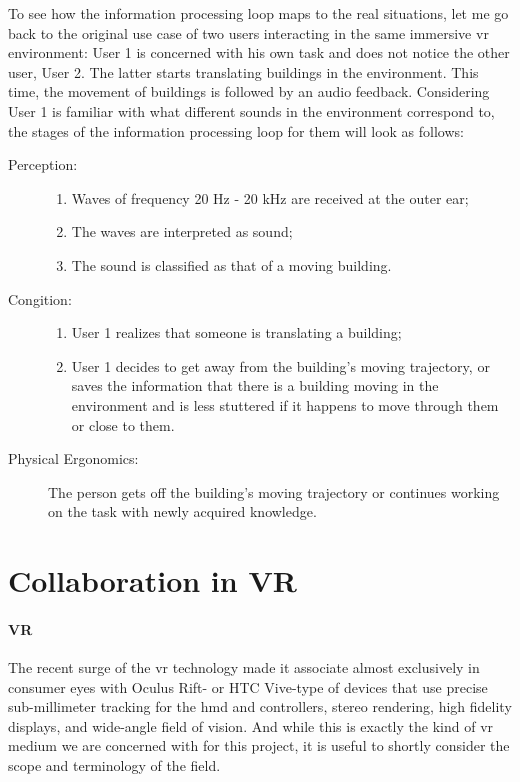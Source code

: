 To see how the information processing loop maps to the real situations, let me go back to the original use case of two users interacting in the same immersive \gls{vr} environment: User 1 is concerned with his own task and does not notice the other user, User 2. The latter starts translating buildings in the environment. This time, the movement of buildings is followed by an audio feedback.
Considering User 1 is familiar with what different sounds in the environment correspond to, the stages of the information processing loop for them will look as follows:
\begin{description}
	\item[Perception:] \hfill
		\begin{enumerate}
			\item Waves of frequency 20 Hz - 20 kHz are received at the outer ear;
			\item The waves are interpreted as sound;
			\item The sound is classified as that of a moving building.
		\end{enumerate}
	\item[Congition:] \hfill
		
		\begin{enumerate}
			\item User 1 realizes that someone is translating a building;
			\item User 1 decides to get away from the building's moving trajectory, or saves the information that there is a building moving in the environment and is less stuttered if it happens to move through them or close to them.
		\end{enumerate}
	\item[Physical Ergonomics:] \hfill
			
			The person gets off the building's moving trajectory or continues working on the task with newly acquired knowledge.
		
\end{description}

\section{Collaboration in VR}

\paragraph{VR}
The recent surge of the \gls{vr} technology made it associate almost exclusively in consumer eyes with Oculus Rift- or HTC Vive-type of devices that use precise sub-millimeter tracking for the \gls{hmd} and controllers, stereo rendering, high fidelity displays, and wide-angle field of vision. And while this is exactly the kind of \gls{vr} medium we are concerned with for this project, it is useful to shortly consider the scope and terminology of the field.

